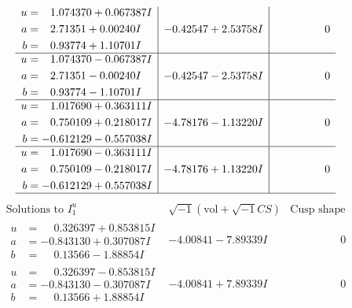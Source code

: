 \documentclass[1p]{elsarticle_modified}
\theoremstyle{definition}
\newcommand{\I}{\sqrt{-1}}
\begin{document}
$$\begin{array}{c|c|c}
\begin{aligned}
u &= \phantom{-}1.074370 + 0.067387 I \\
a &= \phantom{-}2.71351 + 0.00240 I \\
b &= \phantom{-}0.93774 + 1.10701 I\end{aligned}
 & -0.42547 + 2.53758 I & \phantom{-0.000000 } 0 \\ \hline\begin{aligned}
u &= \phantom{-}1.074370 - 0.067387 I \\
a &= \phantom{-}2.71351 - 0.00240 I \\
b &= \phantom{-}0.93774 - 1.10701 I\end{aligned}
 & -0.42547 - 2.53758 I & \phantom{-0.000000 } 0 \\ \hline\begin{aligned}
u &= \phantom{-}1.017690 + 0.363111 I \\
a &= \phantom{-}0.750109 + 0.218017 I \\
b &= -0.612129 - 0.557038 I\end{aligned}
 & -4.78176 - 1.13220 I & \phantom{-0.000000 } 0 \\ \hline\begin{aligned}
u &= \phantom{-}1.017690 - 0.363111 I \\
a &= \phantom{-}0.750109 - 0.218017 I \\
b &= -0.612129 + 0.557038 I\end{aligned}
 & -4.78176 + 1.13220 I & \phantom{-0.000000 } 0\\
 \hline 
 \end{array}$$\newpage$$\begin{array}{c|c|c}  
\text{Solutions to }I^u_{1}& \I (\text{vol} + \sqrt{-1}CS) & \text{Cusp shape}\\
 \hline 
\begin{aligned}
u &= \phantom{-}0.326397 + 0.853815 I \\
a &= -0.843130 + 0.307087 I \\
b &= \phantom{-}0.13566 - 1.88854 I\end{aligned}
 & -4.00841 - 7.89339 I & \phantom{-0.000000 } 0 \\ \hline\begin{aligned}
u &= \phantom{-}0.326397 - 0.853815 I \\
a &= -0.843130 - 0.307087 I \\
b &= \phantom{-}0.13566 + 1.88854 I\end{aligned}
 & -4.00841 + 7.89339 I & \phantom{-0.000000 } 0 \\ \hline\begin{aligned}

\end{aligned}
\end{array}$$
\end{document}
